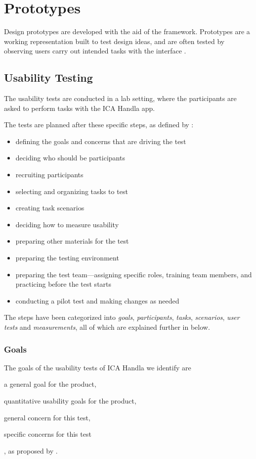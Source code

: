 \section{Prototypes}
Design prototypes are developed with the aid of the framework. Prototypes are a working representation built to test design ideas, and are often tested by observing users carry out intended tasks with the interface \cite{Walker2002}.

\subsection{Usability Testing}
The usability tests are conducted in a lab setting, where the participants are asked to perform tasks with the ICA Handla app.

The tests are planned after these specific steps, as defined by \cite{Dumas1999}:

\begin{itemize}[noitemsep]
  \item defining the goals and concerns that are driving the test
  \item deciding who should be participants
  \item recruiting participants
  \item selecting and organizing tasks to test
  \item creating task scenarios
  \item deciding how to measure usability
  \item preparing other materials for the test
  \item preparing the testing environment
  \item preparing the test team---assigning specific roles, training team members, and practicing before the test starts
  \item conducting a pilot test and making changes as needed
\end{itemize}

The steps have been categorized into \textit{goals}, \textit{participants}, \textit{tasks}, \textit{scenarios}, \textit{user tests} and \textit{measurements}, all of which are explained further in below.

\subsubsection{Goals}
\label{subsubsec:goals}
The goals of the usability tests of ICA Handla we identify are \begin{enumerate*}[label=(\(\arabic*\))]
  \item a general goal for the product,
  \item quantitative usability goals for the product,
  \item general concern for this test,
  \item specific concerns for this test
\end{enumerate*}, as proposed by \cite{Dumas1999}.

